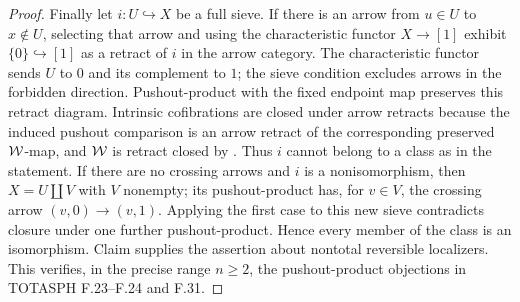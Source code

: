\begin{proof}
Finally let $i:U\hookrightarrow X$ be a full sieve. If there is an arrow from $u\in U$ to $x\notin U$, selecting that arrow and using the characteristic functor $X\to[1]$ exhibit $\{0\}\hookrightarrow[1]$ as a retract of $i$ in the arrow category. The characteristic functor sends $U$ to $0$ and its complement to $1$; the sieve condition excludes arrows in the forbidden direction. Pushout-product with the fixed endpoint map preserves this retract diagram. Intrinsic cofibrations are closed under arrow retracts because the induced pushout comparison is an arrow retract of the corresponding preserved $\mathcal{W}$-map, and $\mathcal{W}$ is retract closed by . Thus $i$ cannot belong to a class as in the statement. If there are no crossing arrows and $i$ is a nonisomorphism, then $X=U\amalg V$ with $V$ nonempty; its pushout-product has, for $v\in V$, the crossing arrow $(v,0)\to(v,1)$. Applying the first case to this new sieve contradicts closure under one further pushout-product. Hence every member of the class is an isomorphism. Claim  supplies the assertion about nontotal reversible localizers. This verifies, in the precise range $n\geq2$, the pushout-product objections in TOTASPH F.23--F.24 and F.31.
\end{proof}

